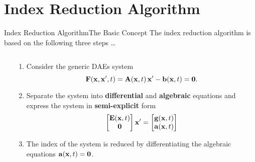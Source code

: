 
\section{Index Reduction Algorithm}

\begin{frame}{Index Reduction Algorithm}{The Basic Concept}
  The index reduction algorithm is based on the following three steps \dots
  \begin{columns}
    \begin{column}[c]{0.2\textwidth}
      \flushright
      \vspace{-2.5em}%
    \end{column}
    \begin{column}[c]{0.85\textwidth}
      \begin{enumerate}[<+->]
        \item Consider the generic \acp{DAE} system
        \begin{equation*}
          \mathbf{F}(\mathbf{x}, \mathbf{x}^\prime, t) = \mathbf{A}(\mathbf{x}, t) \, \mathbf{x}^\prime - \mathbf{b}(\mathbf{x}, t) = \mathbf{0} \text{.}
        \end{equation*}
        \item Separate the system into \textbf{differential} and \textbf{algebraic} equations and express the system in \textbf{semi-explicit} form
        \begin{equation*}
          \begin{bmatrix} \mathbf{E}(\mathbf{x}, t) \\ \mathbf{0} \end{bmatrix} \mathbf{x}^\prime = \begin{bmatrix} \mathbf{g}(\mathbf{x}, t) \\ \mathbf{a}(\mathbf{x}, t) \end{bmatrix}
        \end{equation*}
        \item The index of the system is reduced by differentiating the algebraic equations $\mathbf{a}(\mathbf{x}, t) = \mathbf{0}$.
      \end{enumerate}
    \end{column}
  \end{columns}
  \vspace{0.75em}
\end{frame}

